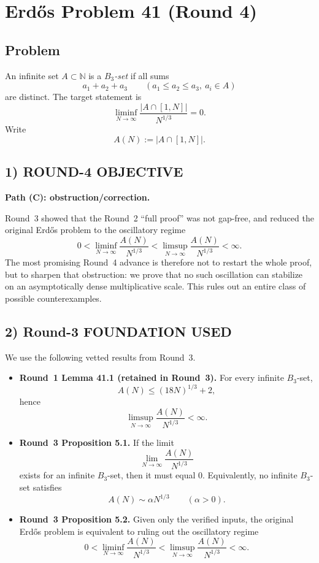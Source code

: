 \section{Erd\H{o}s Problem 41 (Round 4)}

\subsection{Problem}
An infinite set $A\subset \mathbb{N}$ is a \emph{$B_3$-set} if all sums
\[
a_1+a_2+a_3\qquad (a_1\le a_2\le a_3,\ a_i\in A)
\]
are distinct. The target statement is
\[
\liminf_{N\to\infty}\frac{|A\cap[1,N]|}{N^{1/3}}=0.
\]
Write
\[
A(N):=|A\cap[1,N]|.
\]

\subsection{1) ROUND-4 OBJECTIVE}
\textbf{Path (C): obstruction/correction.}

Round~3 showed that the Round~2 ``full proof'' was not gap-free, and reduced the original Erd\H{o}s problem to the oscillatory regime
\[
0<\liminf_{N\to\infty}\frac{A(N)}{N^{1/3}}
<
\limsup_{N\to\infty}\frac{A(N)}{N^{1/3}}
<\infty.
\]
The most promising Round~4 advance is therefore not to restart the whole proof, but to sharpen that obstruction: we prove that no such oscillation can stabilize on an asymptotically dense multiplicative scale. This rules out an entire class of possible counterexamples.

\subsection{2) Round-3 FOUNDATION USED}
We use the following vetted results from Round~3.
\begin{itemize}
  \item \textbf{Round~1 Lemma 41.1 (retained in Round~3).} For every infinite $B_3$-set,
  \[
  A(N)\le (18N)^{1/3}+2,
  \]
  hence
  \[
  \limsup_{N\to\infty}\frac{A(N)}{N^{1/3}}<\infty.
  \]
  \item \textbf{Round~3 Proposition 5.1.} If the limit
  \[
  \lim_{N\to\infty}\frac{A(N)}{N^{1/3}}
  \]
  exists for an infinite $B_3$-set, then it must equal $0$. Equivalently, no infinite $B_3$-set satisfies
  \[
  A(N)\sim \alpha N^{1/3}
  \qquad (\alpha>0).
  \]
  \item \textbf{Round~3 Proposition 5.2.} Given only the verified inputs, the original Erd\H{o}s problem is equivalent to ruling out the oscillatory regime
  \[
  0<\liminf_{N\to\infty}\frac{A(N)}{N^{1/3}}
  <
  \limsup_{N\to\infty}\frac{A(N)}{N^{1/3}}
  <\infty.
  \]
\end{itemize}

